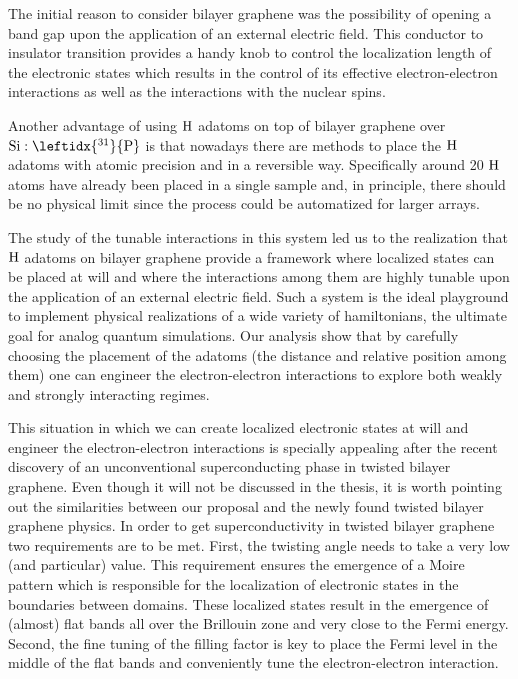 
The initial reason to consider bilayer graphene was the possibility of opening a band gap upon the application of an external electric field\cite{McCann2006, Castro2007, Oostinga2007, Zhang2009, Taychatanapat2010, Castro2010a, Ponomarenko2011, Allen2012, Sui2015}.
This conductor to insulator transition provides a handy knob to control the localization length of the electronic states which results in the control of its effective electron-electron interactions as well as the interactions with the nuclear spins.

Another advantage of using $\ce{H}$ adatoms on top of bilayer graphene over $\ce{Si}:\leftidx{^{31}}{\ce{P}}$ is that nowadays there are methods to place the $\ce{H}$ adatoms with atomic precision and in a reversible way\cite{elias2009,Brihuega2016,Brihuega2017}. Specifically around 20 $\ce{H}$ atoms have already been placed in a single sample and, in principle, there should be no physical limit since the process could be automatized for larger arrays.
\medskip

The study of the tunable interactions in this system led us to the realization that $\ce{H}$ adatoms on bilayer graphene provide a framework where localized states can be placed at will and where the interactions among them are highly tunable upon the application of an external electric field.
Such a system is the ideal playground to implement physical realizations of a wide variety of hamiltonians, the ultimate goal for analog quantum simulations.
Our analysis show that by carefully choosing the placement of the adatoms (the distance and relative position among them) one can engineer the electron-electron interactions to explore both weakly and strongly interacting regimes.
\bigskip

This situation in which we can create localized electronic states at will and engineer the electron-electron interactions is specially appealing after the recent discovery of an unconventional superconducting phase in twisted bilayer graphene\cite{Cao2018,Cao2018a}.
Even though it will not be discussed in the thesis, it is worth pointing out the similarities between our proposal and the newly found twisted bilayer graphene physics.
In order to get superconductivity in twisted bilayer graphene two requirements are to be met. First, the twisting angle needs to take a very low (and particular) value. This requirement ensures the emergence of a Moire pattern which is responsible for the localization of electronic states in the boundaries between domains. These localized states result in the emergence of (almost) flat bands all over the Brillouin zone and very close to the Fermi energy. Second, the fine tuning of the filling factor is key to place the Fermi level in the middle of the flat bands and conveniently tune the electron-electron interaction.

